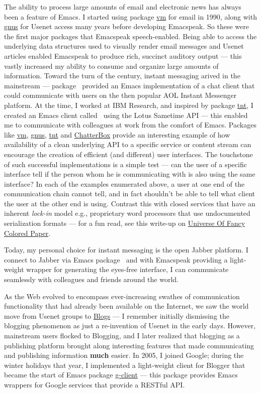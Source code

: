 \documentclass[11pt]{article}
\begin{document}
The ability to process large amounts of email and electronic news
has always been a feature of Emacs. I started using package \uline{vm}
for email in 1990, along with \uline{gnus} for Usenet access many years
before developing Emacspeak. So these were the first major
packages that Emacspeak speech-enabled. Being able to access the
underlying data structures used to visually render email messages
and Usenet articles enabled Emacspeak to produce rich, succinct
auditory output — this vastly increased my ability to consume and
organize large amounts of information. Toward the turn of the
century, instant messaging arived in the mainstream — package
$_{\text{ }}$provided an Emacs implementation of a chat client that
could communicate with users on the then popular AOL Instant
Messenger platform. At the time, I worked at IBM Research, and
inspired by package \uline{tnt}, I created an Emacs client called
$_{\text{ }}$using the Lotus Sametime API — this enabled me to
communicate with colleagues at work from the comfort of
Emacs. Packages like \uline{vm}, \uline{gnus}, \uline{tnt} and \uline{ChatterBox} provide
an interesting example of how availability of a clean underlying
API to a specific service or content stream can encourage the
creation of efficient (and different) user interfaces. The
touchstone of such successful implementations is a simple test —
can the user of a specific interface tell if the person whom he
is communicating with is also using the same interface? In each
of the examples enumerated above, a user at one end of the
communication chain cannot tell, and in fact shouldn't be able to
tell what client the user at the other end is using. Contrast
this with closed services that have an inherent \emph{lock-in} model
e.g., proprietary word processors that use undocumented
serialization formats — for a fun read, see this write-up on
\href{http://emacspeak.sourceforge.net/publications/colored-paper.html}{Universe Of Fancy Colored Paper}.


Today, my personal choice for instant messaging is the open
Jabber platform. I connect to Jabber via Emacs package
$_{\text{ }}$and with Emacspeak providing a light-weight
wrapper for generating the eyes-free interface, I can communicate
seamlessly with colleagues and friends around the world.

As the Web evolved to encompass ever-increasing swathes of
communication functionality that had already been available on
the Internet, we saw the world move from Usenet groups to \uline{Blogs}
— I remember initially dismissing the blogging phenomenon as just
a re-invention of Usenet in the early days. However, mainstream
users flocked to Blogging, and I later realized that blogging as
a publishing platform brought along interesting features that
made communicating and publishing information \textbf{much} easier. In
2005, I joined Google; during the winter holidays that year, I
implemented a light-weight client for Blogger that became the
start of Emacs package \uline{g-client} — this package provides Emacs
wrappers for Google services that provide a RESTful API.
\end{document}
